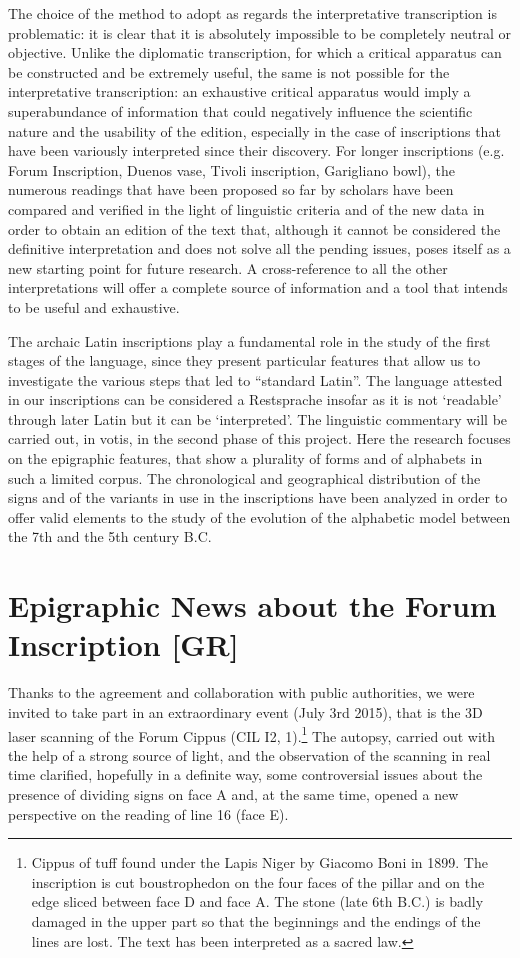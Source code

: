 \documentclass[amsthm,ebook]{saparticle}
\begin{document}
The choice of the method to adopt as regards the interpretative transcription is problematic: it is clear that it is
absolutely impossible to be completely neutral or objective. Unlike the diplomatic transcription, for which a critical
apparatus can be constructed and be extremely useful, the same is not possible for the interpretative transcription: an
exhaustive critical apparatus would imply a superabundance of information that could negatively influence the
scientific nature and the usability of the edition, especially in the case of inscriptions that have been variously
interpreted since their discovery. For longer inscriptions (e.g. Forum Inscription, Duenos vase, Tivoli inscription,
Garigliano bowl), the numerous readings that have been proposed so far by scholars have been compared and verified in
the light of linguistic criteria and of the new data in order to obtain an edition of the text that, although it cannot
be considered the definitive interpretation and does not solve all the pending issues, poses itself as a new starting
point for future research. A cross-reference to all the other interpretations will offer a complete source of
information and a tool that intends to be useful and exhaustive.

The archaic Latin inscriptions play a fundamental role in the study of the first stages of the language, since they
present particular features that allow us to investigate the various steps that led to “standard Latin”. The language
attested in our inscriptions can be considered a Restsprache insofar as it is not `readable' through later Latin
but it can be `interpreted'. The linguistic commentary will be carried out, in votis, in the second phase of this
project. Here the research focuses on the epigraphic features, that show a plurality of forms and of alphabets in such
a limited corpus. The chronological and geographical distribution of the signs and of the variants in use in the
inscriptions have been analyzed in order to offer valid elements to the study of the evolution of the alphabetic model
between the 7th and the 5th century B.C.

\section{Epigraphic News about the Forum Inscription [GR]}


\noindent Thanks to the agreement and collaboration with public authorities, we were invited to take part in an extraordinary
event (July 3rd 2015), that is the 3D laser scanning of the Forum Cippus (CIL I2, 1).\footnote{Cippus of tuff found
under the Lapis Niger by Giacomo Boni in 1899. The inscription is cut boustrophedon on the four faces of the pillar and
on the edge sliced between face D and face A. The stone (late 6th B.C.) is badly damaged in the upper part so that the
beginnings and the endings of the lines are lost. The text has been interpreted as a sacred law.} The autopsy, carried
out with the help of a strong source of light, and the observation of the scanning in real time clarified, hopefully in
a definite way, some controversial issues about the presence of dividing signs on face A and, at the same time, opened
a new perspective on the reading of line 16 (face E). 
\end{document}
